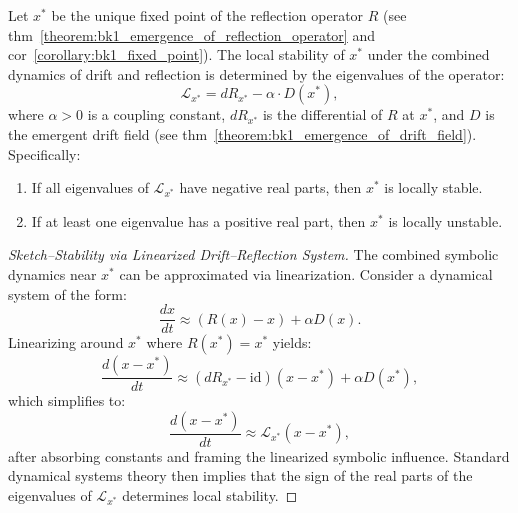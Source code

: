 \begin{lemma}
\label{lemma:bk1_local_stability_analysis}
Let $x^*$ be the unique fixed point of the reflection operator $R$ (see thm~\ref{theorem:bk1_emergence_of_reflection_operator} and cor~\ref{corollary:bk1_fixed_point}). The local stability of $x^*$ under the combined dynamics of drift and reflection is determined by the eigenvalues of the operator:
\[
\mathcal{L}_{x^*} = dR_{x^*} - \alpha \cdot D(x^*),
\]
where $\alpha > 0$ is a coupling constant, $dR_{x^*}$ is the differential of $R$ at $x^*$, and $D$ is the emergent drift field (see thm~\ref{theorem:bk1_emergence_of_drift_field}). Specifically:
\begin{enumerate}
    \item If all eigenvalues of $\mathcal{L}_{x^*}$ have negative real parts, then $x^*$ is locally stable.
    \item If at least one eigenvalue has a positive real part, then $x^*$ is locally unstable.
\end{enumerate}

\begin{proof}[Sketch–Stability via Linearized Drift–Reflection System]
\label{proof:bk1_sketch_stability_drift_reflection}
The combined symbolic dynamics near $x^*$ can be approximated via linearization. Consider a dynamical system of the form:
\[
\frac{dx}{dt} \approx (R(x) - x) + \alpha D(x).
\]
Linearizing around $x^*$ where $R(x^*) = x^*$ yields:
\[
\frac{d(x - x^*)}{dt} \approx (dR_{x^*} - \mathrm{id})(x - x^*) + \alpha D(x^*),
\]
which simplifies to:
\[
\frac{d(x - x^*)}{dt} \approx \mathcal{L}_{x^*}(x - x^*),
\]
after absorbing constants and framing the linearized symbolic influence. Standard dynamical systems theory then implies that the sign of the real parts of the eigenvalues of $\mathcal{L}_{x^*}$ determines local stability.
\end{proof}
\end{lemma}

